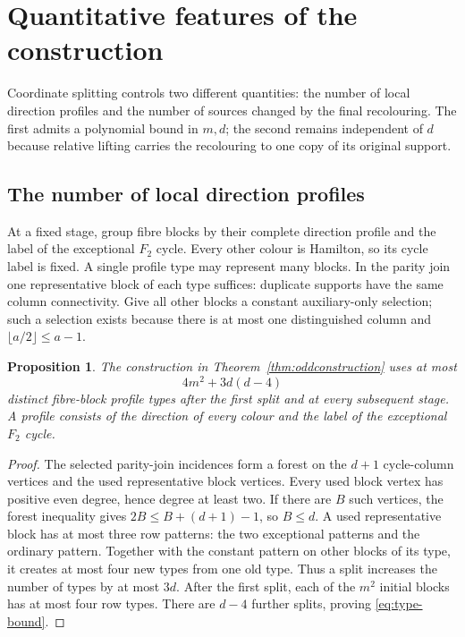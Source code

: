 \documentclass[11pt,reqno]{amsart}
\numberwithin{equation}{section}
\newtheorem{proposition}[theorem]{Proposition}
\theoremstyle{definition}
\theoremstyle{remark}
\begin{document}
\section{Quantitative features of the construction}\label{sec:constructive}
Coordinate splitting controls two different quantities: the number of
local direction profiles and the number of sources changed by the final
recolouring. The first admits a polynomial bound in $m,d$; the second
remains independent of $d$ because relative lifting carries the
recolouring to one copy of its original support.

\subsection{The number of local direction profiles}
At a fixed stage, group fibre blocks by their complete direction profile and the
label of the exceptional $F_2$ cycle. Every other colour is Hamilton, so its cycle label is fixed. A single
profile type may represent many blocks. In the parity join one representative block of each type
suffices: duplicate supports have the same column connectivity. Give all other
blocks a constant auxiliary-only selection; such a selection exists because
there is at most one distinguished column and $\lfloor a/2\rfloor\le a-1$.

\begin{proposition}\label{prop:types}
The construction in Theorem~\ref{thm:oddconstruction} uses at most
\begin{equation}\label{eq:type-bound}
 4m^2+3d(d-4)
\end{equation}
distinct fibre-block profile types after the first split and at every
subsequent stage. A profile consists of the direction of every colour
and the label of the exceptional $F_2$ cycle.
\end{proposition}
\begin{proof}
The selected parity-join incidences form a forest on the $d+1$ cycle-column
vertices and the used representative block vertices. Every used block vertex
has positive even degree, hence degree at least two. If there are $B$ such
vertices, the forest inequality gives $2B\le B+(d+1)-1$, so $B\le d$.
A used representative block has at most three row patterns: the two
exceptional patterns and the ordinary pattern. Together with the constant pattern on other blocks of its
type, it creates at most four new types from one old type. Thus a split increases
the number of types by at most $3d$. After the first split, each of the $m^2$
initial blocks has at most four row types. There are $d-4$ further splits, proving
\eqref{eq:type-bound}.
\end{proof}
\end{document}
